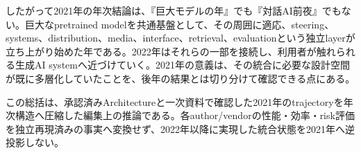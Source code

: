 したがって2021年の年次結論は、『巨大モデルの年』でも『対話AI前夜』でもない。巨大なpretrained modelを共通基盤として、その周囲に適応、steering、systems、distribution、media、interface、retrieval、evaluationという独立layerが立ち上がり始めた年である。2022年はそれらの一部を接続し、利用者が触れられる生成AI systemへ近づけていく。2021年の意義は、その統合に必要な設計空間が既に多層化していたことを、後年の結果とは切り分けて確認できる点にある。\autocite{src-20fd9bba2e7a,src-50244427230b,src-a4561c635fe6,src-b307b4b82867}


\begin{claimboundary}
この総括は、承認済みArchitectureと一次資料で確認した2021年のtrajectoryを年次構造へ圧縮した編集上の推論である。各author/vendorの性能・効率・risk評価を独立再現済みの事実へ変換せず、2022年以降に実現した統合状態を2021年へ逆投影しない。\autocite{src-20fd9bba2e7a,src-50244427230b,src-a4561c635fe6,src-b307b4b82867}
\end{claimboundary}
